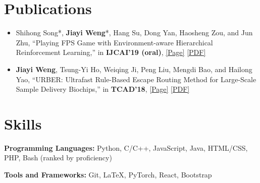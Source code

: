 \documentclass{resume}
\begin{document}
\section{Publications}
\begin{itemize}
    \item Shihong Song*, \textbf{Jiayi Weng}*, Hang Su, Dong Yan, Haosheng Zou, and Jun Zhu, ``Playing FPS Game with Environment-aware Hierarchical Reinforcement Learning,'' in \textbf{IJCAI'19 (oral)}, \href{https://trinkle23897.github.io/cv/viz2018.html}{[Page]} \href{https://www.ijcai.org/proceedings/2019/0482.pdf}{[PDF]}
    \item \textbf{Jiayi Weng}, Tsung-Yi Ho, Weiqing Ji, Peng Liu, Mengdi Bao, and Hailong Yao,  ``URBER: Ultrafast Rule-Based Escape Routing Method for Large-Scale Sample Delivery Biochips,'' in \textbf{TCAD'18}, \href{https://trinkle23897.github.io/cv/urber.html}{[Page]} \href{https://ieeexplore.ieee.org/document/8552446}{[PDF]}
\end{itemize}

\section{Skills}
\textbf{Programming Languages:} \small Python, C/C++, JavaScript, Java, HTML/CSS, PHP, Bash (ranked by proficiency)

\textbf{Tools and Frameworks:} \small Git, \LaTeX, PyTorch, React, Bootstrap
\end{document}
